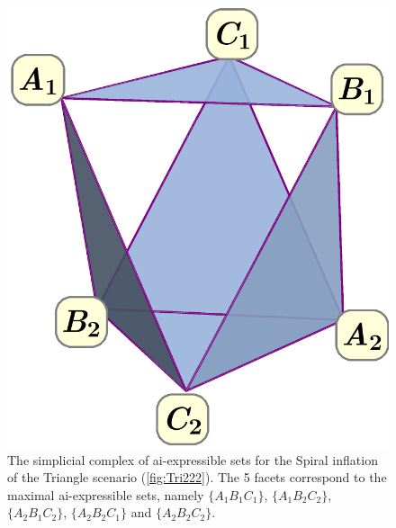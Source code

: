 \documentclass[aps,english,10pt,superscriptaddress,onecolumn,twoside,longbibliography,pra,floatfix,fleqn,nofootinbib]{revtex4-1}
\theoremstyle{definition}
\begin{document}
\begin{figure}[t]
\begin{minipage}[t]{0.3\linewidth}
\includegraphics[scale=0.25]{simplicialcomplex.pdf}
\caption{The simplicial complex of ai-expressible sets for the  Spiral inflation of the Triangle scenario (\cref{fig:Tri222}). The 5 facets correspond to the maximal ai-expressible sets, namely $\{A_1 B_1 C_1\}$, $\{A_1 B_2 C_2\}$, $\{A_2 B_1 C_2\}$, $\{A_2 B_2 C_1\}$ and $\{A_2 B_2 C_2\}$.}\label{fig:simplicialcomplex222}
\end{minipage}
\end{figure}
\end{document}

